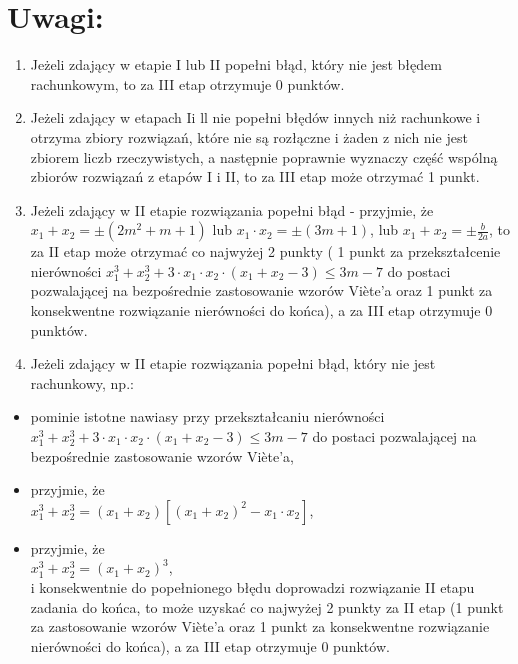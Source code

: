 \documentclass[10pt]{article}
\begin{document}
\section*{Uwagi:}
\begin{enumerate}
  \item Jeżeli zdający w etapie I lub II popełni błąd, który nie jest błędem rachunkowym, to za III etap otrzymuje 0 punktów.
  \item Jeżeli zdający w etapach Ii ll nie popełni błędów innych niż rachunkowe i otrzyma zbiory rozwiązań, które nie są rozłączne i żaden z nich nie jest zbiorem liczb rzeczywistych, a następnie poprawnie wyznaczy część wspólną zbiorów rozwiązań z etapów I i II, to za III etap może otrzymać 1 punkt.
  \item Jeżeli zdający w II etapie rozwiązania popełni błąd - przyjmie, że\\
$x_{1}+x_{2}= \pm\left(2 m^{2}+m+1\right)$ lub $x_{1} \cdot x_{2}= \pm(3 m+1)$, lub $x_{1}+x_{2}= \pm \frac{b}{2 a}$, to za II etap może otrzymać co najwyżej 2 punkty ( 1 punkt za przekształcenie nierówności $x_{1}^{3}+x_{2}^{3}+3 \cdot x_{1} \cdot x_{2} \cdot\left(x_{1}+x_{2}-3\right) \leq 3 m-7$ do postaci pozwalającej na bezpośrednie zastosowanie wzorów Viète'a oraz 1 punkt za konsekwentne rozwiązanie nierówności do końca), a za III etap otrzymuje 0 punktów.
  \item Jeżeli zdający w II etapie rozwiązania popełni błąd, który nie jest rachunkowy, np.:
\end{enumerate}

\begin{itemize}
  \item pominie istotne nawiasy przy przekształcaniu nierówności $x_{1}^{3}+x_{2}^{3}+3 \cdot x_{1} \cdot x_{2} \cdot\left(x_{1}+x_{2}-3\right) \leq 3 m-7$ do postaci pozwalającej na bezpośrednie zastosowanie wzorów Viète'a,
  \item przyjmie, że\\
$x_{1}^{3}+x_{2}^{3}=\left(x_{1}+x_{2}\right)\left[\left(x_{1}+x_{2}\right)^{2}-x_{1} \cdot x_{2}\right]$,
  \item przyjmie, że\\
$x_{1}^{3}+x_{2}^{3}=\left(x_{1}+x_{2}\right)^{3}$,\\
i konsekwentnie do popełnionego błędu doprowadzi rozwiązanie II etapu zadania do końca, to może uzyskać co najwyżej 2 punkty za II etap (1 punkt za zastosowanie wzorów Viète'a oraz 1 punkt za konsekwentne rozwiązanie nierówności do końca), a za III etap otrzymuje 0 punktów.
\end{itemize}
\end{document}
